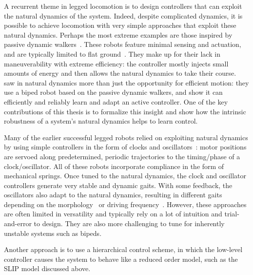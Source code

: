 
A recurrent theme in legged locomotion is to design controllers that can exploit the natural dynamics of the system. Indeed, despite complicated dynamics, it is possible to achieve locomotion with very simple approaches that exploit these natural dynamics.
Perhaps the most extreme examples are those inspired by passive dynamic walkers~\cite{mcgeer1990passive}. These robots feature minimal sensing and actuation, and are typically limited to flat ground~\cite{bhounsule2012design,wisse2006design}. They make up for their lack in maneuverability with extreme efficiency: the controller mostly injects small amounts of energy and then allows the natural dynamics to take their course.~\textcite{tedrake2005learning} saw in natural dynamics more than just the opportunity for efficient motion: they use a biped robot based on the passive dynamic walkers, and show it can efficiently and reliably learn and adapt an active controller. One of the key contributions of this thesis is to formalize this insight and show how the intrinsic robustness of a system's natural dynamics helps to learn control. \par
Many of the earlier successful legged robots relied on exploiting natural dynamics by using simple controllers in the form of clocks and oscillators~\cite{sprowitz2013towards,buchli2006resonance,altendorfer2001rhex,owaki2013simple}: motor positions are servoed along predetermined, periodic trajectories to the timing/phase of a clock/oscillator. All of these robots incorporate compliance in the form of mechanical springs. Once tuned to the natural dynamics, the clock and oscillator controllers generate very stable and dynamic gaits. With some feedback, the oscillators also adapt to the natural dynamics, resulting in different gaits depending on the morphology~\cite{owaki2013simple} or driving frequency~\cite{owaki2013simple,owaki2017quadruped}. %
However, these approaches are often limited in versatility and typically rely on a lot of intuition and trial-and-error to design. They are also more challenging to tune for inherently unstable systems such as bipeds. \par
Another approach is to use a hierarchical control scheme, in which the low-level controller causes the system to behave like a reduced order model, such as the SLIP model discussed above.
